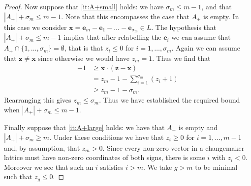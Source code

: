 \documentclass[10pt,a4paper]{amsart}
\newcommand{\e}{\bm{e}}
\begin{document}
\begin{proof}
Now suppose that \eqref{it:A+small} holds: we have $\sigma_m\leq m-1$, and that $|A_+|+\sigma_m\leq m-1$. Note that this encompasses the case that $A_+$ is empty. In this case we consider $\bm{x}=\e_m-\e_1-\dots - \e_{\sigma_m}\in L$. The hypothesis that $|A_+|+\sigma_m\leq m-1$ implies that after relabelling the $\e_i$ we can assume that $A_+ \cap \{1, \dots, \sigma_m\}=\emptyset$, that is that $z_i\leq 0$ for $i=1, \dots, \sigma_m$. Again we can assume that $\bm{z}\neq \bm{x}$ since otherwise we would have $z_m=1$. Thus we find that
\begin{align*}
    -1&\geq \bm{x}\cdot (\bm{z}-\bm{x}) \\
    &= z_m-1 - \sum_{i=1}^{\sigma_m} (z_i+1)\\
    &\geq z_m -1 -\sigma_m.
\end{align*}
Rearranging this gives $z_m\leq \sigma_m$. Thus we have established the required bound when $|A_+|+\sigma_m\leq m-1$.

Finally suppose that \eqref{it:A+large} holds: we have that $A_-$ is empty and $|A_+|+\sigma_m\geq m$. Under these conditions we have that $z_i\geq 0$ for $i=1,\dots, m-1$ and, by assumption, that $z_m>0$. Since every non-zero vector in a changemaker lattice must have non-zero coordinates of both signs, there is some $i$ with $z_i<0$. Moreover we see that such an $i$ satisfies $i>m$. We take $g>m$ to be minimal such that $z_g\leq 0$.


\end{proof}
\end{document}
